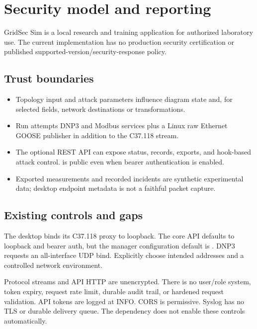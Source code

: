 \chapter{Security model and reporting}\label{chapter-12}
GridSec Sim is a local research and training application for authorized laboratory use. The current implementation has no production security certification or published supported-version/security-response policy.

\section*{Trust boundaries}
\begin{itemize}
\item Topology input and attack parameters influence diagram state and, for selected fields, network destinations or transformations.
\item Run attempts DNP3 and Modbus services plus a Linux raw Ethernet GOOSE publisher in addition to the C37.118 stream.
\item The optional REST API can expose status, records, exports, and hook-based attack control.  is public even when bearer authentication is enabled.
\item Exported measurements and recorded incidents are synthetic experimental data; desktop endpoint metadata is not a faithful packet capture.
\end{itemize}

\section*{Existing controls and gaps}
The desktop binds its C37.118 proxy to loopback. The core API defaults to loopback and bearer auth, but the manager configuration default is . DNP3 requests an all-interface UDP bind. Explicitly choose intended addresses and a controlled network environment.

Protocol streams and API HTTP are unencrypted. There is no user/role system, token expiry, request rate limit, durable audit trail, or hardened request validation. API tokens are logged at INFO. CORS is permissive. Syslog has no TLS or durable delivery queue. The  dependency does not enable these controls automatically.

